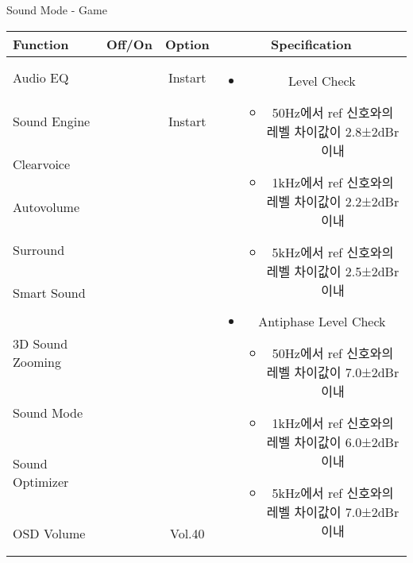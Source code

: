 \begin{frame}[t]{Sound Mode - Game}
\begin{tiny}
\begin{tabular}{@{}lccc@{}}
\toprule
Function & Off/On & Option & Specification \\
\midrule
Audio EQ & \color{black}{Off} & Instart &
\multirow{10}{60mm}{
\begin{itemize}
\item Level Check
  \begin{itemize}
  \item 50Hz에서 ref 신호와의 레벨 차이값이 2.8±2dBr 이내
  \item 1kHz에서 ref 신호와의 레벨 차이값이 2.2±2dBr 이내
  \item 5kHz에서 ref 신호와의 레벨 차이값이 2.5±2dBr 이내
  \end{itemize}
\item Antiphase Level Check
  \begin{itemize}
  \item 50Hz에서 ref 신호와의 레벨 차이값이 7.0±2dBr 이내
  \item 1kHz에서 ref 신호와의 레벨 차이값이 6.0±2dBr 이내
  \item 5kHz에서 ref 신호와의 레벨 차이값이 7.0±2dBr 이내
  \end{itemize}
\end{itemize}
} \\
Sound Engine & \color{blue}{On} & Instart & \\
Clearvoice & \color{black}{Off} & & \\
Autovolume & \color{black}{Off} & & \\
Surround & \color{black}{Off} & & \\
Smart Sound & \color{black}{Off} & & \\
3D Sound Zooming & \color{black}{Off} & & \\
Sound Mode & \color{blue}{On} & \color{blue}{Game} & \\
Sound Optimizer & \color{black}{Off} & & \\
OSD Volume & \color{blue}{On} & Vol.40 & \\
\midrule
\end{tabular}
\end{tiny}

\end{frame}